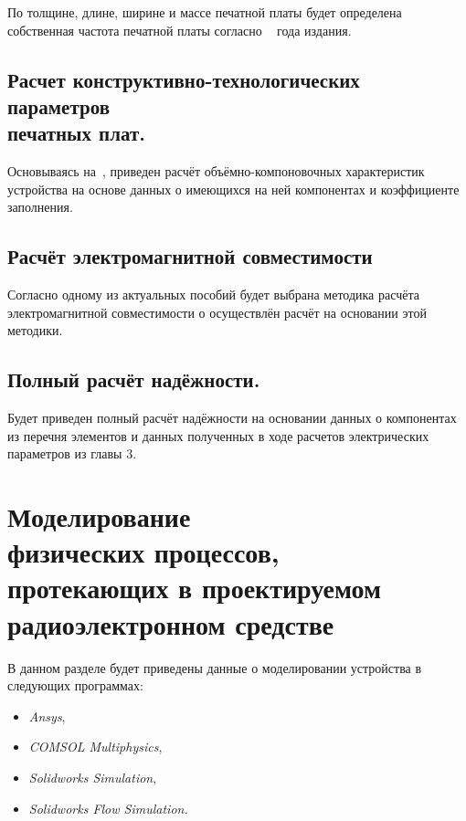 \documentclass[a4paper]{bsuir-std}
\begin{document}
По толщине, длине, ширине и массе печатной платы будет определена
собственная частота печатной платы согласно ~\cite{Kalenkovich2012}
года издания.

\subsection{Расчет конструктивно-технологических параметров\\
  печатных плат. }

Основываясь на~\cite{Kostukevich2012}, приведен расчёт
объёмно-компоновочных характеристик устройства на основе данных о
имеющихся на ней компонентах и коэффициенте заполнения.

\subsection{Расчёт электромагнитной совместимости}

Согласно одному из актуальных пособий будет выбрана методика расчёта
электромагнитной совместимости о осуществлён расчёт на основании этой
методики.

\subsection{Полный расчёт надёжности. }

Будет приведен полный расчёт надёжности на основании данных о
компонентах из перечня элементов и данных полученных в ходе расчетов
электрических параметров из главы 3.

\section{Моделирование \\
  физических процессов, \\
  протекающих в проектируемом\\
  радиоэлектронном средстве}

В данном разделе будет приведены данные о моделировании устройства в
следующих программах:
\begin{itemize}
\item \textit{Ansys},
  
\item \textit{COMSOL Multiphysics},
\item \textit{Solidworks Simulation},
  
\item \textit{Solidworks Flow Simulation.}
\end{itemize}
\end{document}
